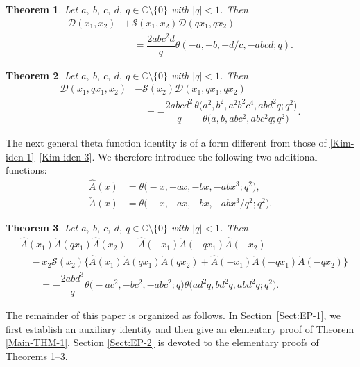 \documentclass[12pt,reqno]{amsart}
\numberwithin{equation}{section}
\theoremstyle{plain}
\newtheorem{theorem}{Theorem}[section]
\theoremstyle{definition}
\begin{document}
\begin{theorem}{\textup{\cite[Theorem~5.1]{Kim2026}}}\label{Main-THM-2}
Let $a,\!\:b,\!\:c,\!\:d,\!\:q\in\mathbb{C}\setminus\{0\}$ with $|q|<1$. Then
\begin{align}
\mathscr{D}(x_1,x_2) &+\mathscr{S}(x_1,x_2)\mathscr{D}(qx_1,qx_2)\nonumber\\
 &\quad=\dfrac{2abc^2d}{q}\theta(-a,-b,-d/c,-abcd;q).\label{Kim-iden-2}
\end{align}
\end{theorem}

\begin{theorem}{\textup{\cite[Theorem~2.1]{Kim2026}}}\label{Main-THM-3}
Let $a,\!\:b,\!\:c,\!\:d,\!\:q\in\mathbb{C}\setminus\{0\}$ with $|q|<1$. Then
\begin{align}
\mathscr{D}(x_1,qx_1,x_2) &-\mathscr{S}(x_2)\mathscr{D}(x_1,qx_1,qx_2)\nonumber\\
 &\quad=-\dfrac{2abcd^2}{q}\dfrac{\theta\big(a^2,b^2,a^2b^2c^4,abd^2q;q^2\big)}
{\theta\big(a,b,abc^2,abc^2q;q^2\big)}.\label{Kim-iden-3}
\end{align}
\end{theorem}

The next general theta function identity is of a form different from those of
\eqref{Kim-iden-1}--\eqref{Kim-iden-3}. We therefore introduce the following two
additional functions:
\begin{align*}
\hat{A}(x) &=\theta\big({-}x,-ax,-bx,-abx^3;q^2\big), \\
\check{A}(x) &=\theta\big({-}x,-ax,-bx,-abx^3/q^2;q^2\big).
\end{align*}

\begin{theorem}{\textup{\cite[Theorem~3.1]{Kim2026}}}\label{Main-THM-4}
Let $a,\!\:b,\!\:c,\!\:d,\!\:q\in\mathbb{C}\setminus\{0\}$ with $|q|<1$. Then
\begin{align}
 &\hat{A}(x_1)\check{A}(qx_1)\hat{A}(x_2)-\hat{A}(-x_1)\check{A}(-qx_1)\hat{A}(-x_2)
\nonumber\\
 &\quad-x_2\mathscr{S}(x_2)\big\{\hat{A}(x_1)\check{A}(qx_1)\check{A}(qx_2)
+\hat{A}(-x_1)\check{A}(-qx_1)\check{A}(-qx_2)\big\}\nonumber\\
 &\qquad=-\dfrac{2abd^3}{q}\theta\big({-}ac^2,-bc^2,-abc^2;q\big)
\theta\big(ad^2q,bd^2q,abd^2q;q^2\big).\label{Kim-iden-4}
\end{align}
\end{theorem}

The remainder of this paper is organized as follows. In Section~\ref{Sect:EP-1}, we
first establish an auxiliary identity and then give an elementary proof of Theorem
\ref{Main-THM-1}. Section \ref{Sect:EP-2} is devoted to the elementary proofs of
Theorems \ref{Main-THM-2}--\ref{Main-THM-4}.
\end{document}
